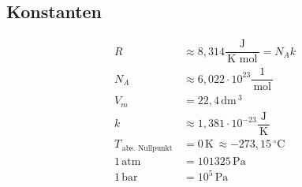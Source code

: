 \documentclass[a4paper,12pt]{article}
\numberwithin{equation}{section}
\begin{document}

\newpage


\subsection{Konstanten}
\begin{align} 
        R&\approx 8,314\dfrac{\,\text{J}\,}{\,\text{K}\,\,\text{mol}\,}=N_Ak\\
        N_A&\approx 6,022\cdot 10^{23}\dfrac{1}{\,\text{mol}\,}\\
        V_m&=22,4\,\text{dm}\,^3\\
        k&\approx 1,381\cdot 10^{-23}\dfrac{\,\text{J}\,}{\,\text{K}\,}\\
        T_{\,\text{abs. Nullpunkt}\,}&=0\,\text{K}\,\approx -273,15\,^\circ\text{C}\,\\
        1\,\text{atm}\,&=101325\,\text{Pa}\,\\
        1\,\text{bar}\,&=10^5\,\text{Pa}\,
\end{align} 


\newpage


\newpage
\end{document}
